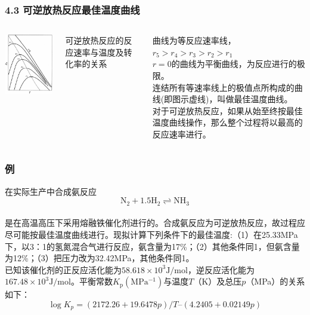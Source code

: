 \begin{frame}
	\frametitle{4.3 可逆放热反应最佳温度曲线}
	\begin{columns}[c]
		\column{7cm}
		\centerline{\includegraphics[width=5cm]{figs/fig2.4}}
		\centerline{\scriptsize{可逆放热反应的反应速率与温度及转化率的关系}}
		\column{7cm}
		曲线为等反应速率线，$r_5>r_4>r_3>r_2>r_1$
		\\$r=0$的曲线为平衡曲线，为反应进行的极限。
		\\连结所有等速率线上的极值点所构成的曲线(即图示虚线)，叫做最佳温度曲线。
		\\对于可逆放热反应，如果从始至终按最佳温度曲线操作，那么整个过程将以最高的反应速率进行。
	\end{columns}
\end{frame}


\begin{frame}
	\frametitle{例}
	在实际生产中合成氨反应
	$$\mathrm{N_2}+1.5\mathrm{H_2}\rightleftharpoons \mathrm{NH_3}$$
	\\是在高温高压下采用熔融铁催化剂进行的。合成氨反应为可逆放热反应，故过程应尽可能按最佳温度曲线进行。现拟计算下列条件下的最佳温度:（1）在25.33MPa下，以3：1的氢氮混合气进行反应，氨含量为17\%；（2）其他条件同1，但氨含量为12\%；（3）把压力改为32.42MPa，其他条件同1。
	\\已知该催化剂的正反应活化能为$58.618×10^3\mathrm{J/mol}$，逆反应活化能为$167.48×10^3\mathrm{J/mol}$。平衡常数$K_\mathrm{p}\mathrm{(MPa^{-1})}$与温度$T$（K）及总压$p$（MPa）的关系如下：
	$$\log{K_p}=(2172.26 + 19.6478p)/T – (4.2405 + 0.02149p)$$
	
\end{frame}


